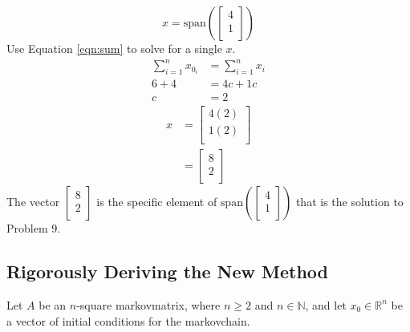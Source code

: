 \documentclass[titlepage]{article}
\newcommand{\spn}[1]{\text{span}\left( #1 \right)}
\newcommand{\R}{\mathbb{R}}
\newcommand{\N}{\mathbb{N}}
\begin{document}
\begin{equation*}
    x = \spn{
        \begin{bmatrix}
            4\\
            1\\
        \end{bmatrix}
    }
\end{equation*}
Use Equation \ref{eqn:sum} to solve for a single $x$.
\begin{align*}
    \sum_{i=1}^n x_{0_i} &= \sum_{i=1}^n x_i\\
    6+4 &= 4c+1c\\
    c &= 2
\end{align*}
\begin{align*}
    x &=
    \begin{bmatrix}
        4(2)\\
        1(2)\\
    \end{bmatrix}\\
    &=
    \begin{bmatrix}
        8\\
        2\\
    \end{bmatrix}
\end{align*}
The vector $
    \begin{bmatrix}
        8\\
        2\\
    \end{bmatrix}
$ is the specific element of $
    \spn{
        \begin{bmatrix}
            4\\
            1\\
        \end{bmatrix}
    }
$ that is the solution to Problem 9.


\subsection{Rigorously Deriving the New Method}\label{sss:rigorous}
Let $A$ be an $n$-square \Gls{markovmatrix}, where $n\geq 2$ and $n\in\N$, and let $x_0\in\R^n$ be a vector of initial conditions for the \Gls{markovchain}.
\end{document}

